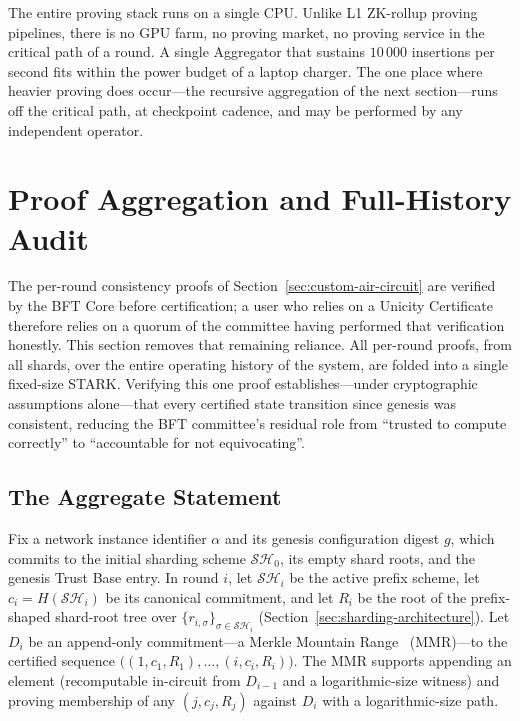 \documentclass[twocolumn]{article}
\begin{document}
The entire proving stack runs on a single CPU. Unlike L1 ZK-rollup proving pipelines, there is no GPU farm, no proving market, no proving service in the critical path of a round. A single Aggregator that sustains $10\,000$ insertions per second fits within the power budget of a laptop charger. The one place where heavier proving does occur---the recursive aggregation of the next section---runs off the critical path, at checkpoint cadence, and may be performed by any independent operator.


\section{Proof Aggregation and Full-History Audit}
\label{sec:aggregation-audit}

The per-round consistency proofs of Section~\ref{sec:custom-air-circuit} are verified by the BFT Core before certification; a user who relies on a Unicity Certificate therefore relies on a quorum of the committee having performed that verification honestly. This section removes that remaining reliance. All per-round proofs, from all shards, over the entire operating history of the system, are folded into a single fixed-size STARK. Verifying this one proof establishes---under cryptographic assumptions alone---that every certified state transition since genesis was consistent, reducing the BFT committee's residual role from ``trusted to compute correctly'' to ``accountable for not equivocating''.

\subsection{The Aggregate Statement}
\label{sec:aggregate-statement}

Fix a network instance identifier $\alpha$ and its genesis configuration digest $g$, which commits to the initial sharding scheme $\mathcal{SH}_0$, its empty shard roots, and the genesis Trust Base entry. In round $i$, let $\mathcal{SH}_i$ be the active prefix scheme, let $c_i=H(\mathcal{SH}_i)$ be its canonical commitment, and let $R_i$ be the root of the prefix-shaped shard-root tree over $\{r_{i,\sigma}\}_{\sigma\in\mathcal{SH}_i}$ (Section~\ref{sec:sharding-architecture}). Let $D_i$ be an append-only commitment---a Merkle Mountain Range~\cite{mmr} (MMR)---to the certified sequence $\big((1,c_1,R_1),\ldots,(i,c_i,R_i)\big)$. The MMR supports appending an element (recomputable in-circuit from $D_{i-1}$ and a logarithmic-size witness) and proving membership of any $(j,c_j,R_j)$ against $D_i$ with a logarithmic-size path.
\end{document}
